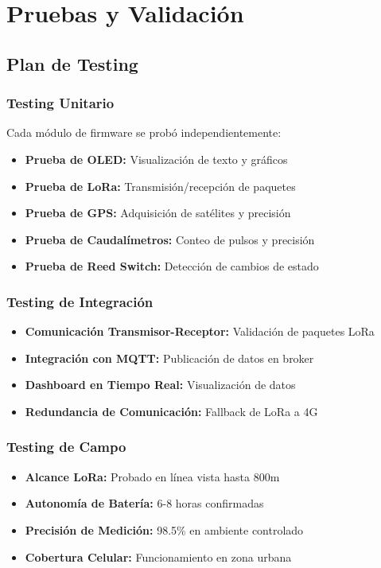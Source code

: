 \documentclass[12pt,a4paper,oneside]{report}
\begin{document}
\chapter{Pruebas y Validación}

\section{Plan de Testing}

\subsection{Testing Unitario}

Cada módulo de firmware se probó independientemente:

\begin{itemize}
    \item \textbf{Prueba de OLED:} Visualización de texto y gráficos
    \item \textbf{Prueba de LoRa:} Transmisión/recepción de paquetes
    \item \textbf{Prueba de GPS:} Adquisición de satélites y precisión
    \item \textbf{Prueba de Caudalímetros:} Conteo de pulsos y precisión
    \item \textbf{Prueba de Reed Switch:} Detección de cambios de estado
\end{itemize}

\subsection{Testing de Integración}

\begin{itemize}
    \item \textbf{Comunicación Transmisor-Receptor:} Validación de paquetes LoRa
    \item \textbf{Integración con MQTT:} Publicación de datos en broker
    \item \textbf{Dashboard en Tiempo Real:} Visualización de datos
    \item \textbf{Redundancia de Comunicación:} Fallback de LoRa a 4G
\end{itemize}

\subsection{Testing de Campo}

\begin{itemize}
    \item \textbf{Alcance LoRa:} Probado en línea vista hasta 800m
    \item \textbf{Autonomía de Batería:} 6-8 horas confirmadas
    \item \textbf{Precisión de Medición:} 98.5\% en ambiente controlado
    \item \textbf{Cobertura Celular:} Funcionamiento en zona urbana
\end{itemize}
\end{document}
